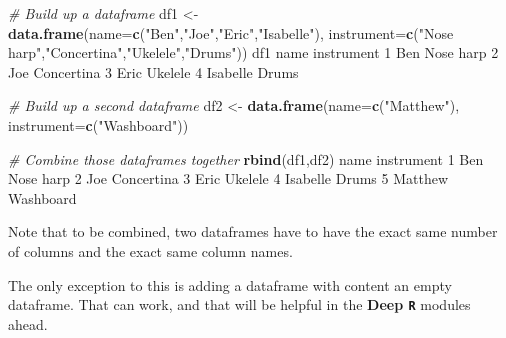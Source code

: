 \documentclass[
]{book}
\newenvironment{Shaded}{\begin{snugshade}}{\end{snugshade}}
\newcommand{\CommentTok}[1]{\textcolor[rgb]{0.56,0.35,0.01}{\textit{#1}}}
\newcommand{\DataTypeTok}[1]{\textcolor[rgb]{0.13,0.29,0.53}{#1}}
\newcommand{\DecValTok}[1]{\textcolor[rgb]{0.00,0.00,0.81}{#1}}
\newcommand{\KeywordTok}[1]{\textcolor[rgb]{0.13,0.29,0.53}{\textbf{#1}}}
\newcommand{\NormalTok}[1]{#1}
\newcommand{\StringTok}[1]{\textcolor[rgb]{0.31,0.60,0.02}{#1}}
\begin{document}
\begin{Shaded}
\begin{Highlighting}[]
\CommentTok{# Build up a dataframe}
\NormalTok{df1 <-}\StringTok{ }\KeywordTok{data.frame}\NormalTok{(}\DataTypeTok{name=}\KeywordTok{c}\NormalTok{(}\StringTok{"Ben"}\NormalTok{,}\StringTok{"Joe"}\NormalTok{,}\StringTok{"Eric"}\NormalTok{,}\StringTok{"Isabelle"}\NormalTok{),}
                  \DataTypeTok{instrument=}\KeywordTok{c}\NormalTok{(}\StringTok{"Nose harp"}\NormalTok{,}\StringTok{"Concertina"}\NormalTok{,}\StringTok{"Ukelele"}\NormalTok{,}\StringTok{"Drums"}\NormalTok{))}
\NormalTok{df1}
\NormalTok{      name instrument}
\DecValTok{1}\NormalTok{      Ben  Nose harp}
\DecValTok{2}\NormalTok{      Joe Concertina}
\DecValTok{3}\NormalTok{     Eric    Ukelele}
\DecValTok{4}\NormalTok{ Isabelle      Drums}
\end{Highlighting}
\end{Shaded}

\begin{Shaded}
\begin{Highlighting}[]
\CommentTok{# Build up a second dataframe}
\NormalTok{df2 <-}\StringTok{ }\KeywordTok{data.frame}\NormalTok{(}\DataTypeTok{name=}\KeywordTok{c}\NormalTok{(}\StringTok{"Matthew"}\NormalTok{),}
                  \DataTypeTok{instrument=}\KeywordTok{c}\NormalTok{(}\StringTok{"Washboard"}\NormalTok{))}
\end{Highlighting}
\end{Shaded}

\begin{Shaded}
\begin{Highlighting}[]
\CommentTok{# Combine those dataframes together}
\KeywordTok{rbind}\NormalTok{(df1,df2)}
\NormalTok{      name instrument}
\DecValTok{1}\NormalTok{      Ben  Nose harp}
\DecValTok{2}\NormalTok{      Joe Concertina}
\DecValTok{3}\NormalTok{     Eric    Ukelele}
\DecValTok{4}\NormalTok{ Isabelle      Drums}
\DecValTok{5}\NormalTok{  Matthew  Washboard}
\end{Highlighting}
\end{Shaded}

Note that to be combined, two dataframes have to have the exact same number of columns and the exact same column names.

The only exception to this is adding a dataframe with content an empty dataframe. That can work, and that will be helpful in the \textbf{Deep \texttt{R}} modules ahead.
\end{document}
